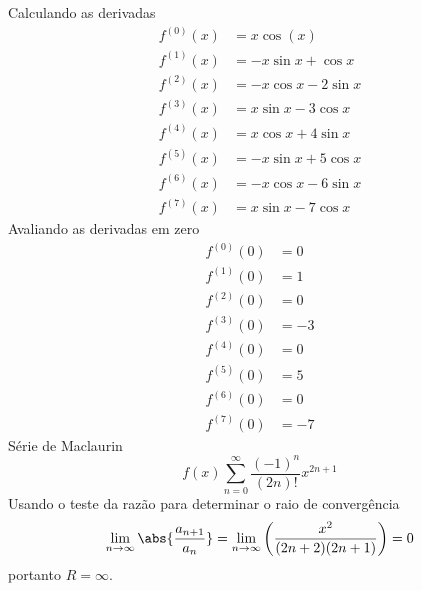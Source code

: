 \begin{exercises}
\begin{exercise}
\begin{answer}
\begin{alphalist}
  \item Calculando as derivadas
  \begin{align*}
  	f^{(0)}(x) & =  x \cos(x)           \\
  	f^{(1)}(x) & = -x \sin x +   \cos x \\
  	f^{(2)}(x) & = -x \cos x - 2 \sin x \\
  	f^{(3)}(x) & =  x \sin x - 3 \cos x \\
  	f^{(4)}(x) & =  x \cos x + 4 \sin x \\
  	f^{(5)}(x) & = -x \sin x + 5 \cos x \\
  	f^{(6)}(x) & = -x \cos x - 6 \sin x \\
  	f^{(7)}(x) & =  x \sin x - 7 \cos x
  \end{align*}
  Avaliando as derivadas em zero
  \begin{align*}
  	f^{(0)}(0) & =  0  \\
  	f^{(1)}(0) & =  1  \\
  	f^{(2)}(0) & =  0  \\
  	f^{(3)}(0) & = -3  \\
  	f^{(4)}(0) & =  0  \\
  	f^{(5)}(0) & =  5  \\
  	f^{(6)}(0) & =  0  \\
  	f^{(7)}(0) & = -7
  \end{align*}
  Série de Maclaurin
  \[
    f(x) \sum_{n=0}^\infty \frac{(-1)^n}{(2n)!} x^{2n+1}
  \]
  Usando o teste da razão para determinar o raio de convergência
  \[
    \lim_{n\to\infty}\abs{\frac{a_{n+1}}{a_n}} =
    \lim_{n\to\infty}\left(\frac{x^2}{(2n+2)(2n+1)}\right) = 0
  \]
  portanto $R=\infty$.


\end{alphalist}
\end{answer}
\end{exercise}
\end{exercises}
